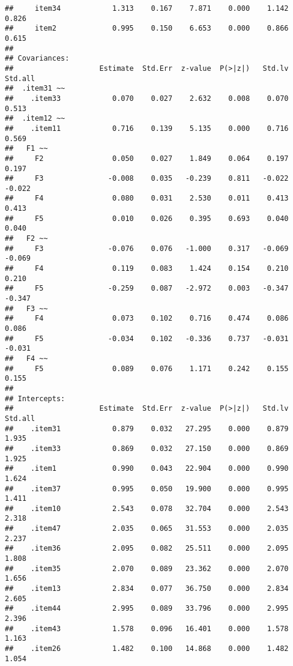 \documentclass[
  english,
  man]{apa6}
\begin{document}
\begin{verbatim}
##     item34            1.313    0.167    7.871    0.000    1.142    0.826
##     item2             0.995    0.150    6.653    0.000    0.866    0.615
## 
## Covariances:
##                    Estimate  Std.Err  z-value  P(>|z|)   Std.lv  Std.all
##  .item31 ~~                                                             
##    .item33            0.070    0.027    2.632    0.008    0.070    0.513
##  .item12 ~~                                                             
##    .item11            0.716    0.139    5.135    0.000    0.716    0.569
##   F1 ~~                                                                 
##     F2                0.050    0.027    1.849    0.064    0.197    0.197
##     F3               -0.008    0.035   -0.239    0.811   -0.022   -0.022
##     F4                0.080    0.031    2.530    0.011    0.413    0.413
##     F5                0.010    0.026    0.395    0.693    0.040    0.040
##   F2 ~~                                                                 
##     F3               -0.076    0.076   -1.000    0.317   -0.069   -0.069
##     F4                0.119    0.083    1.424    0.154    0.210    0.210
##     F5               -0.259    0.087   -2.972    0.003   -0.347   -0.347
##   F3 ~~                                                                 
##     F4                0.073    0.102    0.716    0.474    0.086    0.086
##     F5               -0.034    0.102   -0.336    0.737   -0.031   -0.031
##   F4 ~~                                                                 
##     F5                0.089    0.076    1.171    0.242    0.155    0.155
## 
## Intercepts:
##                    Estimate  Std.Err  z-value  P(>|z|)   Std.lv  Std.all
##    .item31            0.879    0.032   27.295    0.000    0.879    1.935
##    .item33            0.869    0.032   27.150    0.000    0.869    1.925
##    .item1             0.990    0.043   22.904    0.000    0.990    1.624
##    .item37            0.995    0.050   19.900    0.000    0.995    1.411
##    .item10            2.543    0.078   32.704    0.000    2.543    2.318
##    .item47            2.035    0.065   31.553    0.000    2.035    2.237
##    .item36            2.095    0.082   25.511    0.000    2.095    1.808
##    .item35            2.070    0.089   23.362    0.000    2.070    1.656
##    .item13            2.834    0.077   36.750    0.000    2.834    2.605
##    .item44            2.995    0.089   33.796    0.000    2.995    2.396
##    .item43            1.578    0.096   16.401    0.000    1.578    1.163
##    .item26            1.482    0.100   14.868    0.000    1.482    1.054

\end{verbatim}
\end{document}
